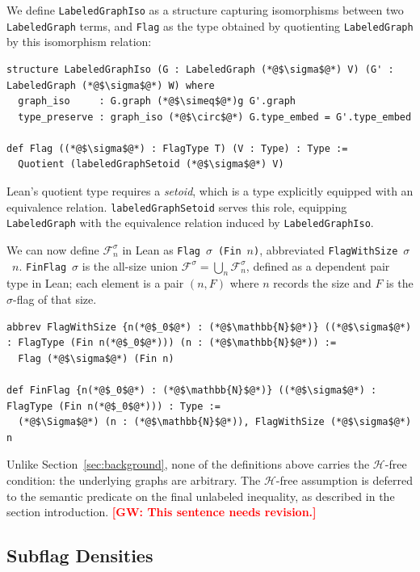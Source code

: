 \documentclass{article}
\newcommand{\lean}[1]{\texttt{#1}}
\newcommand{\gw}[1]{\textcolor{red}{\textbf{[GW: #1]}}}
\begin{document}
We define \lean{LabeledGraphIso} as a structure capturing isomorphisms between
two \lean{LabeledGraph} terms, and \lean{Flag} as the type obtained by
quotienting \lean{LabeledGraph} by this isomorphism relation:
\begin{lstlisting}
structure LabeledGraphIso (G : LabeledGraph (*@$\sigma$@*) V) (G' : LabeledGraph (*@$\sigma$@*) W) where
  graph_iso     : G.graph (*@$\simeq$@*)g G'.graph
  type_preserve : graph_iso (*@$\circ$@*) G.type_embed = G'.type_embed

def Flag ((*@$\sigma$@*) : FlagType T) (V : Type) : Type :=
  Quotient (labeledGraphSetoid (*@$\sigma$@*) V)
\end{lstlisting}
Lean's quotient type requires a \emph{setoid}, which is a type explicitly
equipped with an equivalence relation.  \lean{labeledGraphSetoid} serves this role, equipping
\lean{LabeledGraph} with the equivalence relation induced by 
\lean{LabeledGraphIso}.

We can now define $\mathcal{F}^\sigma_n$ in Lean as \lean{Flag}~$\sigma$~\lean{(Fin}~$n$\lean{)},
abbreviated \lean{FlagWithSize}~$\sigma$~$n$.  \lean{FinFlag}~$\sigma$ is the all-size union $\mathcal{F}^\sigma =
\bigcup_n \mathcal{F}^\sigma_n$, defined as a dependent pair type in Lean; each element is a pair
$(n, F)$ where $n$ records the size and $F$ is the $\sigma$-flag of that size.
\begin{lstlisting}
abbrev FlagWithSize {n(*@$_0$@*) : (*@$\mathbb{N}$@*)} ((*@$\sigma$@*) : FlagType (Fin n(*@$_0$@*))) (n : (*@$\mathbb{N}$@*)) :=
  Flag (*@$\sigma$@*) (Fin n)

def FinFlag {n(*@$_0$@*) : (*@$\mathbb{N}$@*)} ((*@$\sigma$@*) : FlagType (Fin n(*@$_0$@*))) : Type :=
  (*@$\Sigma$@*) (n : (*@$\mathbb{N}$@*)), FlagWithSize (*@$\sigma$@*) n
\end{lstlisting}

Unlike Section~\ref{sec:background}, none of the definitions above carries the
$\mathcal{H}$-free condition: the underlying graphs are arbitrary.  The
$\mathcal{H}$-free assumption is deferred to the semantic predicate on the
final unlabeled inequality, as described in the section introduction.
\gw{This sentence needs revision.}

\subsection{Subflag Densities}
\end{document}
